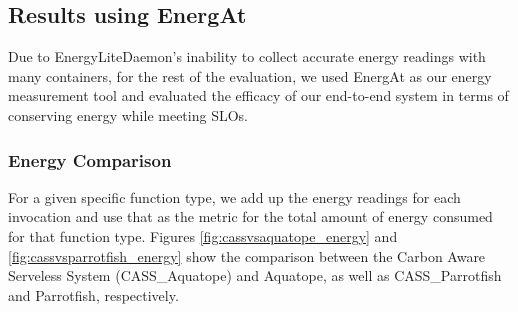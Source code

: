 \documentclass[times, 10pt,twocolumn]{article}
\begin{document}



\subsection{Results using EnergAt}

Due to EnergyLiteDaemon's inability to collect accurate energy readings with many containers, for the rest of the evaluation, we used EnergAt as our energy measurement tool and evaluated the efficacy of our end-to-end system in terms of conserving energy while meeting SLOs. 

\subsubsection{Energy Comparison}
For a given specific function type, we add up the energy readings for each invocation and use that as the metric for the total amount of energy consumed for that function type. Figures \ref{fig:cassvsaquatope_energy} and \ref{fig:cassvsparrotfish_energy} show the comparison between the Carbon Aware Serveless System (CASS\_Aquatope) and Aquatope, as well as CASS\_Parrotfish and Parrotfish, respectively. 
\end{document}
